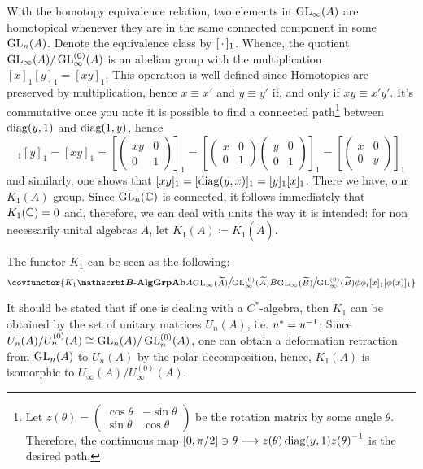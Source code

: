 With the homotopy equivalence relation, two elements in $\operatorname{GL}_\infty(A)$ are homotopical whenever they are in the same connected component in some $\operatorname{GL}_n(A)$. Denote the equivalence class by $[\operatorname{\,\cdot\,}]_1$. Whence, the quotient $\operatorname{GL}_\infty(A)/\operatorname{GL}_\infty^{(0)}(A)$ is an abelian group with the multiplication $[x]_1[y]_1 = [xy]_1$. This operation is well defined since Homotopies are preserved by multiplication, hence $x \equiv x'$ and $y\equiv y'$ if, and only if $xy\equiv x'y'$. It's commutative once you note it is possible to find a connected path\footnote{Let $z(\theta) = \left(\begin{smallmatrix}\cos \theta & -\sin \theta \\ \sin \theta & \cos \theta \end{smallmatrix}\right)$ be the rotation matrix by some angle $\theta$. Therefore, the continuous map $[0,\pi/2] \ni \theta \longrightarrow z(\theta) \operatorname{diag}(y,1) {z(\theta)}^{-1}$ is the desired path. } between $\operatorname{diag}(y,1)$ and $\operatorname{diag}(1,y)$, hence 
    \begin{equation*}
        [x]_1[y]_1 = [xy]_1 = \left[\begin{pmatrix}
            xy & 0 \\ 0 & 1
        \end{pmatrix}\right]_1= \left[\begin{pmatrix}
            x & 0 \\ 0 & 1
        \end{pmatrix}\begin{pmatrix}
            y & 0 \\ 0 & 1
        \end{pmatrix}\right]_1 = \left[\begin{pmatrix}
            x & 0 \\ 0 & y
        \end{pmatrix}\right]_1 
    \end{equation*}    
    and similarly, one shows that $[xy]_1 = [\operatorname{diag}(y,x)]_1 = [y]_1[x]_1$. There we have, our $K_1(A)$ group. Since $\operatorname{GL}_n(\operatorname{\mathbb{C}})$ is connected, it follows immediately that $K_1(\operatorname{\mathbb{C}}) = 0$ and, therefore, we can deal with units the way it is intended: for non necessarily unital algebras $A$, let $K_1(A) \coloneqq K_1(\widetilde{A})$.

\begin{definicao}
    The functor $K_1$ can be seen as the following:
    \begin{equation*}
        \covfunctor{{K_1}{\BAlg}{\Ab{\Grp}}{A}{\mfrac{\GL_\infty(\widetilde A)}{\GL_\infty^{(0)}(\widetilde A)}}{B}{\mfrac{\GL_\infty(\widetilde B)}{\GL_\infty^{(0)}(\widetilde B)}}{\phi}{\sub\phi1}{[x]_1}{[\phi(x)]_1}}
    \end{equation*}
\end{definicao}

\begin{observacao}
    It should be stated that if one is dealing with a $C^*$-algebra, then $K_1$ can be obtained by the set of unitary matrices $U_n(A)$, i.e. $u^* = {u}^{-1}$; Since $U_n(A)/U_n^{(0)}(A) \cong \operatorname{GL}_n(A)/\operatorname{GL}_n^{(0)}(A)$, one can obtain a deformation retraction from $\operatorname{GL}_n(A)$ to $U_n(A)$ by the polar decomposition, hence, $K_1(A)$ is isomorphic to $U_\infty(A)/U_\infty^{(0)}(A)$.  
\end{observacao}
